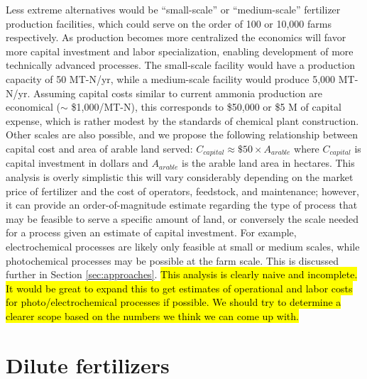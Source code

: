 Less extreme alternatives would be ``small-scale'' or ``medium-scale'' fertilizer production facilities, which could serve on the order of 100 or 10,000 farms respectively. As production becomes more centralized the economics will favor more capital investment and labor specialization, enabling development of more technically advanced processes. The small-scale facility would have a production capacity of 50 MT-N/yr, while a medium-scale facility would produce 5,000 MT-N/yr. Assuming capital costs similar to current ammonia production are economical ($\sim$ \$1,000/MT-N), this corresponds to \$50,000 or \$5 M of capital expense, which is rather modest by the standards of chemical plant construction. Other scales are also possible, and we propose the following relationship between capital cost and area of arable land served: $C_{capital} \approx \$ 50 \times A_{arable}$ where $C_{capital}$ is capital investment in dollars and $A_{arable}$ is the arable land area in hectares. This analysis is overly simplistic this will vary considerably depending on the market price of fertilizer and the cost of operators, feedstock, and maintenance; however, it can provide an order-of-magnitude estimate regarding the type of process that may be feasible to serve a specific amount of land, or conversely the scale needed for a process given an estimate of capital investment. For example, electrochemical processes are likely only feasible at small or medium scales, while photochemical processes may be possible at the farm scale. This is discussed further in Section \ref{sec:approaches}. \hl{This analysis is clearly naive and incomplete. It would be great to expand this to get estimates of operational and labor costs for photo/electrochemical processes if possible. We should try to determine a clearer scope based on the numbers we think we can come up with.}

\section{Dilute fertilizers}

